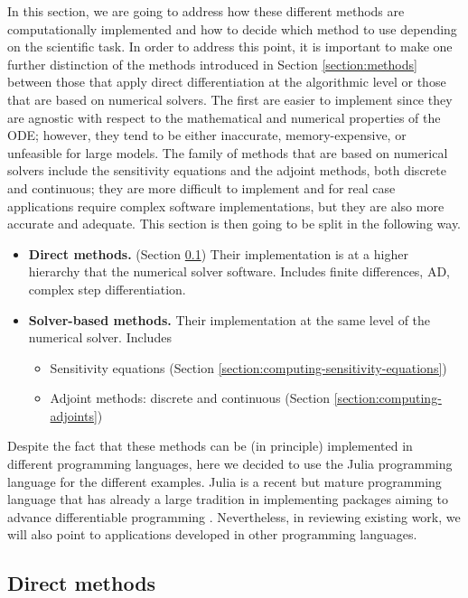 In this section, we are going to address how these different methods are computationally implemented and how to decide which method to use depending on the scientific task.
In order to address this point, it is important to make one further distinction of the methods introduced in Section \ref{section:methods} between those that apply direct differentiation at the algorithmic level or those that are based on numerical solvers.  
The first are easier to implement since they are agnostic with respect to the mathematical and numerical properties of the ODE; however, they tend to be either inaccurate, memory-expensive, or unfeasible for large models. 
The family of methods that are based on numerical solvers include the sensitivity equations and the adjoint methods, both discrete and continuous; they are more difficult to implement and for real case applications require complex software implementations, but they are also more accurate and adequate. 
This section is then going to be split in the following way.
\begin{itemize}
    \item \textbf{Direct methods.} (Section \ref{section:direct-methods}) Their implementation is at a higher hierarchy that the numerical solver software. Includes finite differences, AD, complex step differentiation.
    \item \textbf{Solver-based methods.} Their implementation at the same level of the numerical solver. Includes 
    \begin{itemize}
        \item Sensitivity equations (Section \ref{section:computing-sensitivity-equations})
        \item Adjoint methods: discrete and continuous (Section \ref{section:computing-adjoints})
    \end{itemize}
\end{itemize}
Despite the fact that these methods can be (in principle) implemented in different programming languages, here we decided to use the Julia programming language for the different examples. 
Julia is a recent but mature programming language that has already a large tradition in implementing packages aiming to advance differentiable programming \cite{Bezanson_Karpinski_Shah_Edelman_2012, Julialang_2017}.
Nevertheless, in reviewing existing work, we will also point to applications developed in other programming languages.

\subsection{Direct methods}
\label{section:direct-methods}

